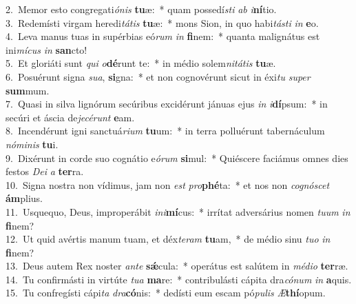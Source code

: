 {2.~}Memor esto congregati\textit{ó}\textit{nis} \textbf{tu}æ:~* quam possedí\textit{sti} \textit{ab} \textit{i}\textbf{ní}tio.\\
{3.~}Redemísti virgam heredi\textit{tá}\textit{tis} \textbf{tu}æ:~* mons Sion, in quo habi\textit{tá}\textit{sti} \textit{in} \textbf{e}o.\\
{4.~}Leva manus tuas in supérbias eó\textit{rum} \textit{in} \textbf{fi}nem:~* quanta malignátus est ini\textit{mí}\textit{cus} \textit{in} \textbf{san}cto!\\
{5.~}Et gloriáti sunt \textit{qui} \textit{o}\textbf{dé}runt te:~* in médio solem\textit{ni}\textit{tá}\textit{tis} \textbf{tu}æ.\\
{6.~}Posuérunt signa \textit{su}\textit{a}, \textbf{si}gna:~* et non cognovérunt sicut in éxi\textit{tu} \textit{su}\textit{per} \textbf{sum}mum.\\
{7.~}Quasi in silva lignórum secúribus excidérunt jánuas ejus \textit{in} \textit{i}\textbf{dí}psum:~* in secúri et áscia de\textit{je}\textit{cé}\textit{runt} \textbf{e}am.\\
{8.~}Incendérunt igni sanctuá\textit{ri}\textit{um} \textbf{tu}um:~* in terra polluérunt tabernáculum \textit{nó}\textit{mi}\textit{nis} \textbf{tu}i.\\
{9.~}Dixérunt in corde suo cognátio e\textit{ó}\textit{rum} \textbf{si}mul:~* Quiéscere faciámus omnes dies festos \textit{De}\textit{i} \textit{a} \textbf{ter}ra.\\
{10.~}Signa nostra non vídimus, jam non \textit{est} \textit{pro}\textbf{phé}ta:~* et nos non \textit{co}\textit{gnó}\textit{scet} \textbf{ám}plius.\\
{11.~}Usquequo, Deus, improperábit \textit{i}\textit{ni}\textbf{mí}cus:~* irrítat adversárius nomen \textit{tu}\textit{um} \textit{in} \textbf{fi}nem?\\
{12.~}Ut quid avértis manum tuam, et déx\textit{te}\textit{ram} \textbf{tu}am,~* de médio sinu \textit{tu}\textit{o} \textit{in} \textbf{fi}nem?\\
{13.~}Deus autem Rex noster \textit{an}\textit{te} \textbf{sǽ}cula:~* operátus est salútem in \textit{mé}\textit{di}\textit{o} \textbf{ter}ræ.\\
{14.~}Tu confirmásti in virtúte \textit{tu}\textit{a} \textbf{ma}re:~* contribulásti cápita dra\textit{có}\textit{num} \textit{in} \textbf{a}quis.\\
{15.~}Tu confregísti cápi\textit{ta} \textit{dra}\textbf{có}nis:~* dedísti eum escam pó\textit{pu}\textit{lis} \textit{Æ}\textbf{thí}opum.\\
